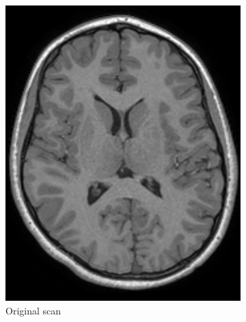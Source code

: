\documentclass{standalone}
\begin{document}
\begin{figure}[H]
		\centering
        \begin{subfigure}[b]{0.325\textwidth}
             \includegraphics[scale=0.213]{img/Chap3/T1W48.png}
             \caption{Original scan}
        \end{subfigure}
        \hfill
        \begin{subfigure}[b]{0.325\textwidth}

\end{subfigure}
\end{figure}
\end{document}
